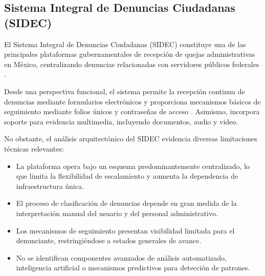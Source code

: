 \subsection{Sistema Integral de Denuncias Ciudadanas (SIDEC)}

\begin{flushleft}
\justifying

El Sistema Integral de Denuncias Ciudadanas (SIDEC) constituye una de las principales plataformas gubernamentales de recepción de quejas administrativas en México, centralizando denuncias relacionadas con servidores públicos federales \cite{6}.

Desde una perspectiva funcional, el sistema permite la recepción continua de denuncias mediante formularios electrónicos y proporciona mecanismos básicos de seguimiento mediante folios únicos y contraseñas de acceso \cite{7}. Asimismo, incorpora soporte para evidencia multimedia, incluyendo documentos, audio y video.

No obstante, el análisis arquitectónico del SIDEC evidencia diversas limitaciones técnicas relevantes:

\begin{itemize}

    \item La plataforma opera bajo un esquema predominantemente centralizado, lo que limita la flexibilidad de escalamiento y aumenta la dependencia de infraestructura única.

    \item El proceso de clasificación de denuncias depende en gran medida de la interpretación manual del usuario y del personal administrativo.

    \item Los mecanismos de seguimiento presentan visibilidad limitada para el denunciante, restringiéndose a estados generales de avance.

    \item No se identifican componentes avanzados de análisis automatizado, inteligencia artificial o mecanismos predictivos para detección de patrones.

\end{itemize}

\end{flushleft}


